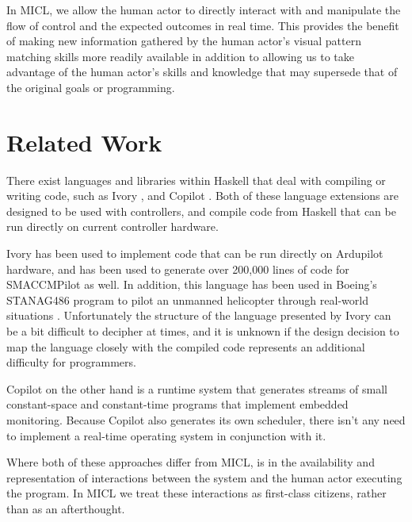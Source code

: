 \documentclass{sig-alternate-05-2015}
\begin{document}
In MICL, we allow the human actor to directly interact with and manipulate the
flow of control and the expected outcomes in real time. This provides the
benefit of making new information gathered by the human actor's visual pattern
matching skills more readily available in addition to allowing us to take
advantage of the human actor's skills and knowledge that may supersede that of
the original goals or programming.


\section{Related Work}
\label{sec:related}
There exist languages and libraries within Haskell that deal with compiling or
writing  code, such as Ivory \cite{elliot2015ivory}, and Copilot
\cite{pike2010copilot}. Both of these language extensions are designed to be
used with controllers, and compile  code from Haskell that can be
run directly on current controller hardware.

Ivory has been used to implement code that can be run directly on Ardupilot
hardware, and has been used to generate over 200,000 lines of code for
SMACCMPilot as well. In addition, this language has been used in Boeing's
STANAG486 program to pilot an unmanned helicopter through real-world
situations \cite{boeing2016auto}. Unfortunately the structure of the language
presented by Ivory can be a bit difficult to decipher at times, and it is
unknown if the design decision to map the language closely with the compiled
code represents an additional difficulty for programmers.

Copilot on the other hand is a runtime system that generates streams of small
constant-space and constant-time  programs that implement embedded
monitoring. Because Copilot also generates its own scheduler, there isn't any
need to implement a real-time operating system in conjunction with it.

Where both of these approaches differ from MICL, is in the availability and
representation of interactions between the system and the human actor
executing the program. In MICL we treat these interactions as first-class
citizens, rather than as an afterthought.




\end{document}
